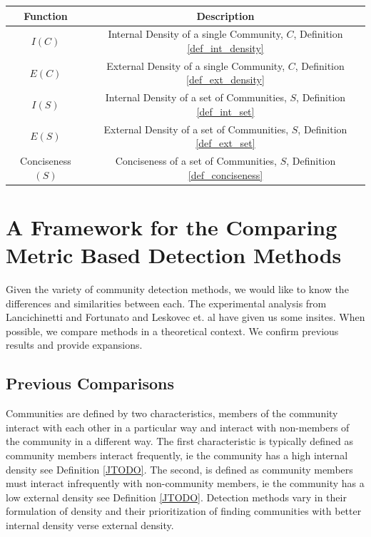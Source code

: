 \documentclass[phd,tocprelim]{cornell}
\renewcommand{\caption}[1]{\singlespacing\hangcaption{#1}\normalspacing}
\begin{document}
\begin{table}
\caption{Introduced Functions}
\begin{center}
\begin{tabular}{|c|c|} \hline
Function & Description \\ \hline
$I(C)$ & Internal Density of a single Community, $C$, Definition \ref{def_int_density} \\ \hline
$E(C)$ & External Density of a single Community, $C$, Definition  \ref{def_ext_density} \\ \hline
$I(S)$ & Internal Density of a set of Communities, $S$, Definition \ref{def_int_set} \\ \hline
$E(S)$ & External Density of a set of Communities, $S$, Definition \ref{def_ext_set} \\ \hline
{\sc Conciseness}$(S)$ & Conciseness of a set of Communities, $S$, Definition \ref{def_conciseness} \\ \hline
\end{tabular}
\end{center}
\label{table_new_functions}
\end{table}

\chapter{A Framework for the Comparing Metric Based Detection Methods}

Given the variety of community detection methods, we would like to know the differences and similarities between each.  The experimental analysis from Lancichinetti and Fortunato \cite{lanc:2009} and Leskovec et. al \cite{leskovec} have given us some insites.  When possible, we compare methods in a theoretical context.  We confirm previous results and provide expansions.


\section{Previous Comparisons}

Communities are defined by two characteristics, members of the community interact with each other in a particular way and interact with non-members of the community in a different way. The first characteristic is typically defined as community members interact frequently, ie the community has a high internal density see Definition \ref{JTODO}.  The second, is defined as community members must interact infrequently with non-community members, ie the community has a low external density see Definition \ref{JTODO}.  Detection methods vary in their formulation of density and their prioritization of finding communities with better internal density verse external density.
\end{document}
